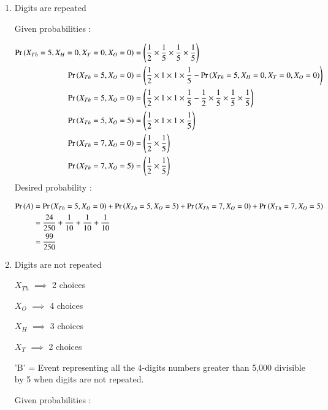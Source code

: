 \documentclass[journal,12pt,onecolumn]{IEEEtran}
\begin{document}
\begin{enumerate}
\item Digits are repeated

 \begin{table}[h]
\begin{center}
		
		\caption{}
		\label{tab:xxx}
\end{center}	
	\end{table}

Given probabilities :

\begin{align}
\Pr\left(X_{Th}=5,X_H=0,X_T=0,X_O=0\right) &= \left(\frac{1}{2}\times\frac{1}{5}\times\frac{1}{5}\times\frac{1}{5} \right) \\
\Pr\left(X_{Th}=5,X_O=0\right) &= \left(\frac{1}{2}\times1\times1\times\frac{1}{5} - \Pr\left(X_{Th}=5,X_H=0,X_T=0,X_O=0\right) \right) \\
\Pr\left(X_{Th}=5,X_O=0\right) &= \left(\frac{1}{2}\times1\times1\times\frac{1}{5} - \frac{1}{2}\times\frac{1}{5}\times\frac{1}{5}\times\frac{1}{5} \right) \\
\Pr\left(X_{Th}=5,X_O=5\right) &= \left(\frac{1}{2}\times1\times1\times\frac{1}{5}\right) \\
\Pr\left(X_{Th}=7,X_O=0\right) &= \left(\frac{1}{2}\times\frac{1}{5} \right) \\
\Pr\left(X_{Th}=7,X_O=5\right) &= \left(\frac{1}{2}\times\frac{1}{5} \right) 
\end{align}
Desired probability :

\begin{align}
\Pr\left(A\right) &= \Pr\left(X_{Th}=5,X_O=0\right) + \Pr\left(X_{Th}=5,X_O=5\right) + \Pr\left(X_{Th}=7,X_O=0\right) + \Pr\left(X_{Th}=7,X_O=5\right) \\
 &=\frac{24}{250} + \frac{1}{10} + \frac{1}{10} + \frac{1}{10}\\
&= \frac{99}{250}
 \end{align}

\item Digits are not repeated 
    \begin{center}
    $X_{Th}$ $\implies$ 2 choices

    $X_O$ $\implies$ 4 choices

    $X_H$ $\implies$ 3 choices

    $X_T$ $\implies$ 2 choices
    \end{center}

'B' = Event representing all the 4-digits numbers greater than 5,000 divisible by 5 when digits are not repeated.

Given probabilities :


\end{enumerate}
\end{document}
